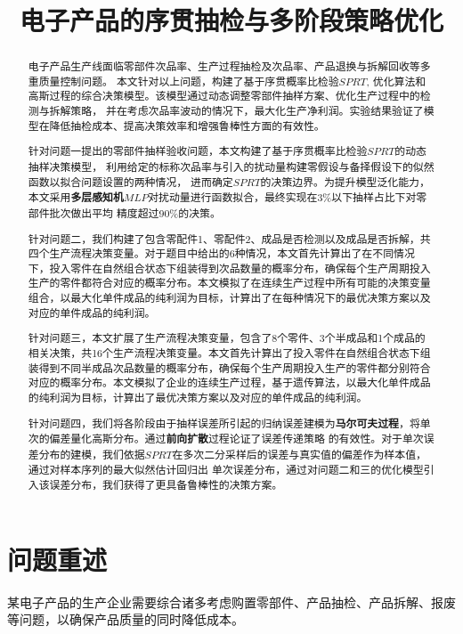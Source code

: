 \documentclass[withoutpreface,bwprint]{cumcmthesis} %
\title{电子产品的序贯抽检与多阶段策略优化}
\begin{document}
\maketitle
\begin{abstract}
	电子产品生产线面临零部件次品率、生产过程抽检及次品率、产品退换与拆解回收等多重质量控制问题。
	本文针对以上问题，构建了基于序贯概率比检验$SPRT$\cite{SPRT},
	优化算法和高斯过程的综合决策模型。该模型通过动态调整零部件抽样方案、优化生产过程中的检测与拆解策略，
	并在考虑次品率波动的情况下，最大化生产净利润。实验结果验证了模型在降低抽检成本、提高决策效率和增强鲁棒性方面的有效性。

	针对问题一提出的零部件抽样验收问题，本文构建了基于序贯概率比检验\textbf{$SPRT$}的动态抽样决策模型，
	利用给定的标称次品率与引入的扰动量构建零假设与备择假设下的似然函数以拟合问题设置的两种情况，
	进而确定\textbf{$SPRT$}的决策边界。为提升模型泛化能力，本文采用\textbf{多层感知机$MLP$}对扰动量进行函数拟合，最终实现在3\%以下抽样占比下对零部件批次做出平均
	精度超过90\%的决策。

	针对问题二，我们构建了包含零配件1、零配件2、成品是否检测以及成品是否拆解，共四个生产流程决策变量。对于题目中给出的6种情况，本文首先计算出了在不同情况下，投入零件在自然组合状态下组装得到次品数量的概率分布，确保每个生产周期投入生产的零件都符合对应的概率分布。本文模拟了在连续生产过程中所有可能的决策变量组合，以最大化单件成品的纯利润为目标，计算出了在每种情况下的最优决策方案以及对应的单件成品的纯利润。
	
	针对问题三，本文扩展了生产流程决策变量，包含了8个零件、3个半成品和1个成品的相关决策，共16个生产流程决策变量。本文首先计算出了投入零件在自然组合状态下组装得到不同半成品次品数量的概率分布，确保每个生产周期投入生产的零件都分别符合对应的概率分布。本文模拟了企业的连续生产过程，基于遗传算法，以最大化单件成品的纯利润为目标，计算出了最优决策方案以及对应的单件成品的纯利润。
	
	针对问题四，我们将各阶段由于抽样误差所引起的归纳误差建模为\textbf{马尔可夫过程}，将单次的偏差量化高斯分布。通过\textbf{前向扩散}过程论证了误差传递策略
	的有效性。对于单次误差分布的建模，我们依据\textbf{$SPRT$}在多次二分采样后的误差与真实值的偏差作为样本值，通过对样本序列的最大似然估计回归出
	单次误差分布，通过对问题二和三的优化模型引入该误差分布，我们获得了更具备鲁棒性的决策方案。

\end{abstract}


\section{问题重述}
某电子产品的生产企业需要综合诸多考虑购置零部件、产品抽检、产品拆解、报废等问题，以确保产品质量的同时降低成本。
\end{document}
